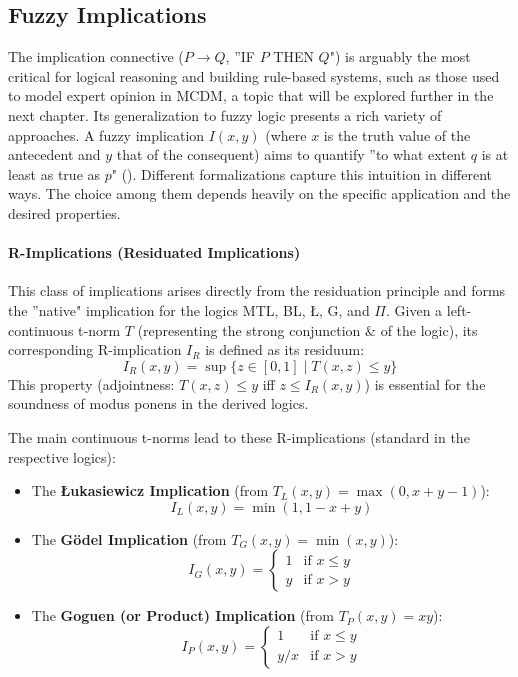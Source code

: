 \subsection{Fuzzy Implications}


The implication connective ($P \rightarrow Q$, ''IF $P$ THEN $Q$") is arguably the most critical for logical reasoning and building rule-based systems, such as those used to model expert opinion in MCDM, a topic that will be explored further in the next chapter. Its generalization to fuzzy logic presents a rich variety of approaches. A fuzzy implication $I(x,y)$ (where $x$ is the truth value of the antecedent and $y$ that of the consequent) aims to quantify ''to what extent $q$ is at least as true as $p$" (\cite[p.57]{FULLER2}). Different formalizations capture this intuition in different ways. The choice among them depends heavily on the specific application and the desired properties.

\paragraph{R-Implications (Residuated Implications)}
This class of implications arises directly from the residuation principle and forms the ''native" implication for the logics MTL, BL, Ł, G, and $\Pi$. Given a left-continuous t-norm $T$ (representing the strong conjunction $\&$ of the logic), its corresponding R-implication $I_R$ is defined as its residuum:
\[
I_R(x, y) = \sup\{z \in [0,1] \mid T(x, z) \le y\}
\]
This property (adjointness: $T(x,z) \le y$ iff $z \le I_R(x, y)$) is essential for the soundness of modus ponens in the derived logics.

\begin{example}
The main continuous t-norms lead to these R-implications (standard in the respective logics):
\begin{itemize}
    \item The \textbf{Łukasiewicz Implication} (from $T_L(x,y) = \max(0, x+y-1)$):
    \[I_L(x,y) = \min(1, 1-x+y)\]
    \item The \textbf{Gödel Implication} (from $T_G(x,y) = \min(x,y)$):
    \[I_G(x,y) = \begin{cases} 1 & \text{if } x \le y \\ y & \text{if } x > y \end{cases}\]
    \item The \textbf{Goguen (or Product) Implication} (from $T_P(x,y) = xy$):
    \[I_P(x,y) = \begin{cases} 1 & \text{if } x \le y \\ y/x & \text{if } x > y \end{cases}\]
\end{itemize}
\end{example}


